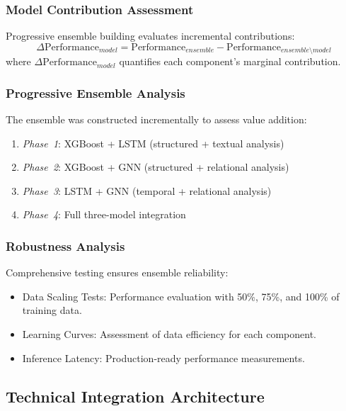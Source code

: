 \documentclass[12pt,a4paper,oneside]{report}
\numberwithin{equation}{chapter}
\begin{document}
\subsubsection{Model Contribution Assessment}

Progressive ensemble building evaluates incremental contributions:
\begin{equation}
\Delta\text{Performance}_{model} = \text{Performance}_{ensemble} - \text{Performance}_{ensemble \setminus model}
\end{equation}
where $\Delta\text{Performance}_{model}$ quantifies each component's marginal contribution.

\subsubsection{Progressive Ensemble Analysis}

The ensemble was constructed incrementally to assess value addition:
\begin{enumerate}
    \item \textit{Phase~1}: XGBoost + LSTM (structured + textual analysis)
    \item \textit{Phase~2}: XGBoost + GNN (structured + relational analysis)
    \item \textit{Phase~3}: LSTM + GNN (temporal + relational analysis)
    \item \textit{Phase~4}: Full three-model integration
\end{enumerate}

\subsubsection{Robustness Analysis}

Comprehensive testing ensures ensemble reliability:
\begin{itemize}
    \item Data Scaling Tests: Performance evaluation with 50\%, 75\%, and 100\% of training data.
    \item Learning Curves: Assessment of data efficiency for each component.
    \item Inference Latency: Production-ready performance measurements.
\end{itemize}

\subsection{Technical Integration Architecture}
\label{subsec:technical-integration}
\end{document}
